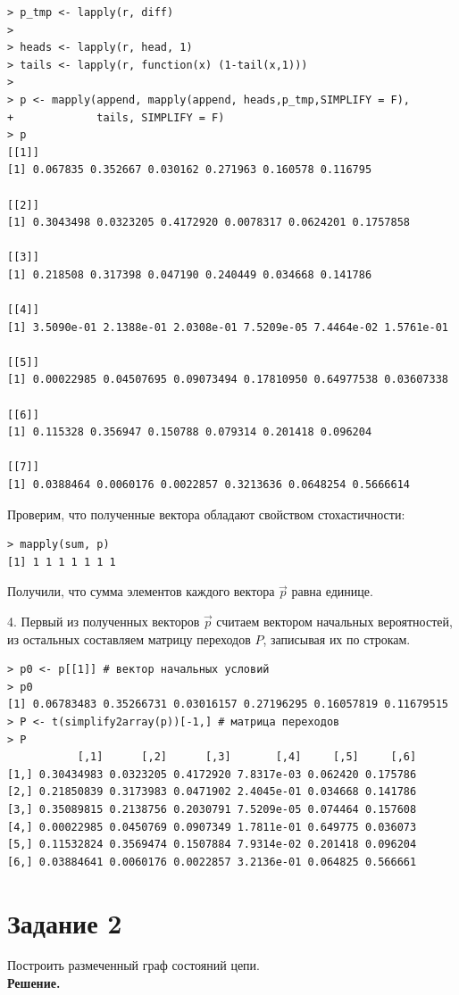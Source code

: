 \documentclass[14pt,a4paper]{scrartcl}
\begin{document}
\begin{verbatim}
> p_tmp <- lapply(r, diff)
> 
> heads <- lapply(r, head, 1)
> tails <- lapply(r, function(x) (1-tail(x,1)))
> 
> p <- mapply(append, mapply(append, heads,p_tmp,SIMPLIFY = F),
+             tails, SIMPLIFY = F)
> p
[[1]]
[1] 0.067835 0.352667 0.030162 0.271963 0.160578 0.116795

[[2]]
[1] 0.3043498 0.0323205 0.4172920 0.0078317 0.0624201 0.1757858

[[3]]
[1] 0.218508 0.317398 0.047190 0.240449 0.034668 0.141786

[[4]]
[1] 3.5090e-01 2.1388e-01 2.0308e-01 7.5209e-05 7.4464e-02 1.5761e-01

[[5]]
[1] 0.00022985 0.04507695 0.09073494 0.17810950 0.64977538 0.03607338

[[6]]
[1] 0.115328 0.356947 0.150788 0.079314 0.201418 0.096204

[[7]]
[1] 0.0388464 0.0060176 0.0022857 0.3213636 0.0648254 0.5666614
\end{verbatim}

Проверим, что полученные вектора обладают свойством стохастичности:

\begin{verbatim}
> mapply(sum, p)
[1] 1 1 1 1 1 1 1
\end{verbatim}

Получили, что сумма элементов каждого вектора $\vec{p}$ равна единице.

4. Первый из полученных векторов $\vec{p}$ считаем вектором начальных вероятностей, из остальных составляем матрицу переходов $P$, записывая их по строкам.

\begin{verbatim}
> p0 <- p[[1]] # вектор начальных условий
> p0
[1] 0.06783483 0.35266731 0.03016157 0.27196295 0.16057819 0.11679515
> P <- t(simplify2array(p))[-1,] # матрица переходов
> P
           [,1]      [,2]      [,3]       [,4]     [,5]     [,6]
[1,] 0.30434983 0.0323205 0.4172920 7.8317e-03 0.062420 0.175786
[2,] 0.21850839 0.3173983 0.0471902 2.4045e-01 0.034668 0.141786
[3,] 0.35089815 0.2138756 0.2030791 7.5209e-05 0.074464 0.157608
[4,] 0.00022985 0.0450769 0.0907349 1.7811e-01 0.649775 0.036073
[5,] 0.11532824 0.3569474 0.1507884 7.9314e-02 0.201418 0.096204
[6,] 0.03884641 0.0060176 0.0022857 3.2136e-01 0.064825 0.566661
\end{verbatim}

\pagebreak
\section*{Задание 2}
Построить размеченный граф состояний цепи.\\
\textbf{Решение.}\\
\end{document}
